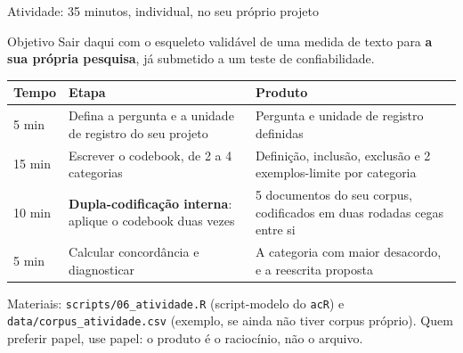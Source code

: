 \documentclass[11pt,aspectratio=169]{beamer}
\begin{document}
\begin{frame}{Atividade: 35 minutos, individual, no seu próprio projeto}
\begin{block}{Objetivo}
Sair daqui com o esqueleto validável de uma medida de texto para \textbf{a sua
própria pesquisa}, já submetido a um teste de confiabilidade.
\end{block}
\vspace{0.15cm}
\begin{table}
\scriptsize
\begin{tabular}{p{1.3cm}p{5.4cm}p{6.1cm}}
\toprule
\textbf{Tempo} & \textbf{Etapa} & \textbf{Produto} \\
\midrule
5 min  & Defina a pergunta e a unidade de registro do seu projeto &
Pergunta e unidade de registro definidas \\
15 min & Escrever o codebook, de 2 a 4 categorias &
Definição, inclusão, exclusão e 2 exemplos-limite por categoria \\
10 min & \textbf{Dupla-codificação interna}: aplique o codebook duas vezes &
5 documentos do seu corpus, codificados em duas rodadas cegas entre si \\
5 min  & Calcular concordância e diagnosticar &
A categoria com maior desacordo, e a reescrita proposta \\
\bottomrule
\end{tabular}
\end{table}
\footnotesize Materiais: \texttt{scripts/06\_atividade.R} (script-modelo do
\texttt{acR}) e \texttt{data/corpus\_atividade.csv} (exemplo, se ainda não
tiver corpus próprio). Quem preferir papel, use papel: o produto é o
raciocínio, não o arquivo.
\end{frame}
\end{document}
